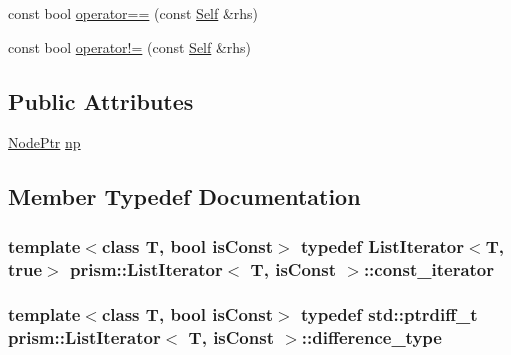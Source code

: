 \begin{DoxyCompactItemize}
\item 
const bool \hyperlink{structprism_1_1_list_iterator_a52ef1ed3d02cf157aea4866c26905b59}{operator==} (const \hyperlink{structprism_1_1_list_iterator_a54dfed5d1937a612aa2ae524b55f8087}{Self} \&rhs)
\item 
const bool \hyperlink{structprism_1_1_list_iterator_a888245e7f95a39274c5b26863f84d84c}{operator!=} (const \hyperlink{structprism_1_1_list_iterator_a54dfed5d1937a612aa2ae524b55f8087}{Self} \&rhs)
\end{DoxyCompactItemize}
\subsection*{Public Attributes}
\begin{DoxyCompactItemize}
\item 
\hyperlink{structprism_1_1_list_iterator_aad2175a44d3db4fd84059ae15158b174}{Node\+Ptr} \hyperlink{structprism_1_1_list_iterator_a62ec8f8f950cd91c3cde64ce4d512136}{np}
\end{DoxyCompactItemize}


\subsection{Member Typedef Documentation}
\subsubsection[{\texorpdfstring{const\+\_\+iterator}{const_iterator}}]{\setlength{\rightskip}{0pt plus 5cm}template$<$class T, bool is\+Const$>$ typedef {\bf List\+Iterator}$<$T, true$>$ {\bf prism\+::\+List\+Iterator}$<$ T, is\+Const $>$\+::{\bf const\+\_\+iterator}}\hypertarget{structprism_1_1_list_iterator_aec39e76f7b988d0718fa4e2aea52ed34}{}\label{structprism_1_1_list_iterator_aec39e76f7b988d0718fa4e2aea52ed34}
\subsubsection[{\texorpdfstring{difference\+\_\+type}{difference_type}}]{\setlength{\rightskip}{0pt plus 5cm}template$<$class T, bool is\+Const$>$ typedef std\+::ptrdiff\+\_\+t {\bf prism\+::\+List\+Iterator}$<$ T, is\+Const $>$\+::{\bf difference\+\_\+type}}\hypertarget{structprism_1_1_list_iterator_a81d24e551a1b9ef7397d37b7d92511cf}{}\label{structprism_1_1_list_iterator_a81d24e551a1b9ef7397d37b7d92511cf}
